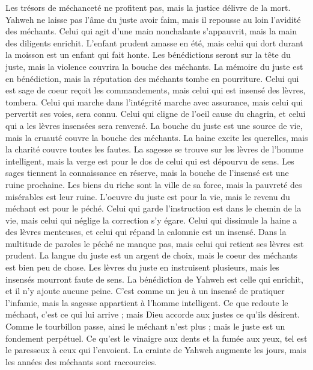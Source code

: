\begin{multicols}{2}
Les trésors de méchanceté ne profitent pas, mais la justice délivre de la mort.
Yahweh ne laisse pas l'âme du juste avoir faim, mais il repousse au loin l'avidité des méchants.
Celui qui agit d'une main nonchalante s'appauvrit, mais la main des diligents enrichit.
L'enfant prudent amasse en été, mais celui qui dort durant la moisson est un enfant qui fait honte.
Les bénédictions seront sur la tête du juste, mais la violence couvrira la bouche des méchants.
La mémoire du juste est en bénédiction, mais la réputation des méchants tombe en pourriture.
Celui qui est sage de coeur reçoit les commandements, mais celui qui est insensé des lèvres, tombera.
Celui qui marche dans l'intégrité marche avec assurance, mais celui qui pervertit ses voies, sera connu.
Celui qui cligne de l'oeil cause du chagrin, et celui qui a les lèvres insensées sera renversé.
La bouche du juste est une source de vie, mais la cruauté couvre la bouche des méchants.
La haine excite les querelles, mais la charité couvre toutes les fautes.
La sagesse se trouve sur les lèvres de l'homme intelligent, mais la verge est pour le dos de celui qui est dépourvu de sens.
Les sages tiennent la connaissance en réserve, mais la bouche de l'insensé est une ruine prochaine.
Les biens du riche sont la ville de sa force, mais la pauvreté des misérables est leur ruine.
L'oeuvre du juste est pour la vie, mais le revenu du méchant est pour le péché.
Celui qui garde l'instruction est dans le chemin de la vie, mais celui qui néglige la correction s'y égare.
Celui qui dissimule la haine a des lèvres menteuses, et celui qui répand la calomnie est un insensé.
Dans la multitude de paroles le péché ne manque pas, mais celui qui retient ses lèvres est prudent.
La langue du juste est un argent de choix, mais le coeur des méchants est bien peu de chose.
Les lèvres du juste en instruisent plusieurs, mais les insensés mourront faute de sens.
La bénédiction de Yahweh est celle qui enrichit, et il n'y ajoute aucune peine.
C'est comme un jeu à un insensé de pratiquer l'infamie, mais la sagesse appartient à l'homme intelligent.
Ce que redoute le méchant, c'est ce qui lui arrive ; mais Dieu accorde aux justes ce qu'ils désirent.
Comme le tourbillon passe, ainsi le méchant n'est plus ; mais le juste est un fondement perpétuel.
Ce qu'est le vinaigre aux dents et la fumée aux yeux, tel est le paresseux à ceux qui l'envoient.
La crainte de Yahweh augmente les jours, mais les années des méchants sont raccourcies.

\end{multicols}
